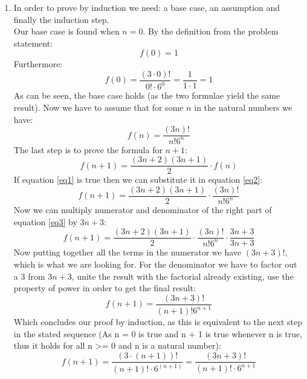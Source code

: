 \begin{enumerate}
\item In order to prove by induction we need: a base case, an assumption and finally the induction step. \\
Our base case is found when $n=0$. By the definition from the problem statement:
\[ f(0)=1 \] Furthermore:
\[ f(0)=\frac{(3\cdot0)!}{0!\cdot 6^{0}}=\frac{1}{1\cdot 1} = 1 \]
As can be seen, the base case holds (as the two formulae yield the same result). Now we have to assume that for some $n$ in the natural numbers we have:
\begin{equation}\label{eq1}
    f(n) = \frac{(3n)!}{n!6^n}
\end{equation}
The last step is to prove the formula for $n+1$:
\begin{equation}\label{eq2}
    f(n+1)=\frac{(3n+2)(3n+1)}{2} \cdot f(n)
\end{equation}
If equation \ref{eq1} is true then we can substitute it in equation \ref{eq2}:
\begin{equation}\label{eq3}
f(n+1)=\frac{(3n+2)(3n+1)}{2} \cdot \frac{(3n)!}{n!6^n}
\end{equation}
Now we can multiply numerator and denominator of the right part of equation \ref{eq3} by $3n+3$:
\[ f(n+1) = \frac{(3n+2)(3n+1)}{2} \cdot \frac{(3n)!}{n!6^n} \cdot \frac{3n+3}{3n+3} \]
Now putting together all the terms in the numerator we have $(3n+3)!$, which is what we are looking for. For the denominator we have to factor out a $3$ from $3n+3$, unite the result with the factorial already existing, use the property of power in order to get the final result:
\[ f(n+1)=\frac{(3n+3)!}{(n+1)!6^{n+1}} \]
Which concludes our proof by induction, as this is equivalent to the next step in the stated sequence (As n = 0 is true and n + 1 is true whenever n is true, thus it holds for all n >= 0 and n is a natural number):
\[ f(n+1) = \frac{(3 \cdot (n + 1))!}{(n+1)! \cdot 6^{(n+1)}} = \frac{(3n + 3)!}{(n+1)! \cdot 6^{n+1}} \]
\end{enumerate}